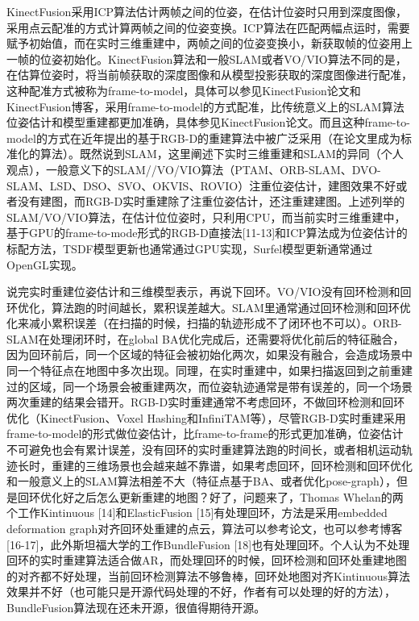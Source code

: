 KinectFusion采用ICP算法估计两帧之间的位姿，在估计位姿时只用到深度图像，采用点云配准的方式计算两帧之间的位姿变换。ICP算法在匹配两幅点运时，需要赋予初始值，而在实时三维重建中，两帧之间的位姿变换小，新获取帧的位姿用上一帧的位姿初始化。KinectFusion算法和一般SLAM或者VO/VIO算法不同的是，在估算位姿时，将当前帧获取的深度图像和从模型投影获取的深度图像进行配准，这种配准方式被称为frame-to-model，具体可以参见KinectFusion论文和KinectFusion博客，采用frame-to-model的方式配准，比传统意义上的SLAM算法位姿估计和模型重建都更加准确，具体参见KinectFusion论文。而且这种frame-to-model的方式在近年提出的基于RGB-D的重建算法中被广泛采用（在论文里成为标准化的算法）。既然说到SLAM，这里阐述下实时三维重建和SLAM的异同（个人观点），一般意义下的SLAM//VO/VIO算法（PTAM、ORB-SLAM、DVO-SLAM、LSD、DSO、SVO、OKVIS、ROVIO）注重位姿估计，建图效果不好或者没有建图，而RGB-D实时重建除了注重位姿估计，还注重建建图。上述列举的SLAM/VO/VIO算法，在估计位位姿时，只利用CPU，而当前实时三维重建中，基于GPU的frame-to-mode形式的RGB-D直接法[11-13]和ICP算法成为位姿估计的标配方法，TSDF模型更新也通常通过GPU实现，Surfel模型更新通常通过OpenGL实现。

说完实时重建位姿估计和三维模型表示，再说下回环。VO/VIO没有回环检测和回环优化，算法跑的时间越长，累积误差越大。SLAM里通常通过回环检测和回环优化来减小累积误差（在扫描的时候，扫描的轨迹形成不了闭环也不可以）。ORB-SLAM在处理闭环时，在global BA优化完成后，还需要将优化前后的特征融合，因为回环前后，同一个区域的特征会被初始化两次，如果没有融合，会造成场景中同一个特征点在地图中多次出现。同理，在实时重建中，如果扫描返回到之前重建过的区域，同一个场景会被重建两次，而位姿轨迹通常是带有误差的，同一个场景两次重建的结果会错开。RGB-D实时重建通常不考虑回环，不做回环检测和回环优化（KinectFusion、Voxel Hashing和InfiniTAM等），尽管RGB-D实时重建采用frame-to-model的形式做位姿估计，比frame-to-frame的形式更加准确，位姿估计不可避免也会有累计误差，没有回环的实时重建算法跑的时间长，或者相机运动轨迹长时，重建的三维场景也会越来越不靠谱，如果考虑回环，回环检测和回环优化和一般意义上的SLAM算法相差不大（特征点基于BA、或者优化pose-graph），但是回环优化好之后怎么更新重建的地图？好了，问题来了，Thomas Whelan的两个工作Kintinuous [14]和ElasticFusion [15]有处理回环，方法是采用embedded deformation graph对齐回环处重建的点云，算法可以参考论文，也可以参考博客[16-17]，此外斯坦福大学的工作BundleFusion [18]也有处理回环。个人认为不处理回环的实时重建算法适合做AR，而处理回环的时候，回环检测和回环处重建地图的对齐都不好处理，当前回环检测算法不够鲁棒，回环处地图对齐Kintinuous算法效果并不好（也可能只是开源代码处理的不好，作者有可以处理的好的方法），BundleFusion算法现在还未开源，很值得期待开源。

